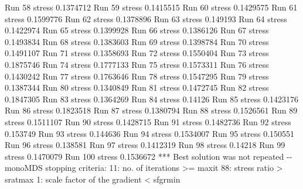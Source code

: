 \documentclass[
]{book}
\newenvironment{Shaded}{\begin{snugshade}}{\end{snugshade}}
\newcommand{\NormalTok}[1]{#1}
\begin{document}
\begin{Shaded}
\begin{Highlighting}[]
\NormalTok{Run 58 stress 0.1374712 }
\NormalTok{Run 59 stress 0.1415515 }
\NormalTok{Run 60 stress 0.1429575 }
\NormalTok{Run 61 stress 0.1599776 }
\NormalTok{Run 62 stress 0.1378896 }
\NormalTok{Run 63 stress 0.149193 }
\NormalTok{Run 64 stress 0.1422974 }
\NormalTok{Run 65 stress 0.1399928 }
\NormalTok{Run 66 stress 0.1386126 }
\NormalTok{Run 67 stress 0.1493834 }
\NormalTok{Run 68 stress 0.1383603 }
\NormalTok{Run 69 stress 0.1398784 }
\NormalTok{Run 70 stress 0.1491107 }
\NormalTok{Run 71 stress 0.1358693 }
\NormalTok{Run 72 stress 0.1550404 }
\NormalTok{Run 73 stress 0.1875746 }
\NormalTok{Run 74 stress 0.1777133 }
\NormalTok{Run 75 stress 0.1573311 }
\NormalTok{Run 76 stress 0.1430242 }
\NormalTok{Run 77 stress 0.1763646 }
\NormalTok{Run 78 stress 0.1547295 }
\NormalTok{Run 79 stress 0.1387344 }
\NormalTok{Run 80 stress 0.1340849 }
\NormalTok{Run 81 stress 0.1472745 }
\NormalTok{Run 82 stress 0.1847305 }
\NormalTok{Run 83 stress 0.1364269 }
\NormalTok{Run 84 stress 0.14126 }
\NormalTok{Run 85 stress 0.1423176 }
\NormalTok{Run 86 stress 0.1823518 }
\NormalTok{Run 87 stress 0.1380794 }
\NormalTok{Run 88 stress 0.1526561 }
\NormalTok{Run 89 stress 0.1511107 }
\NormalTok{Run 90 stress 0.1428715 }
\NormalTok{Run 91 stress 0.1482736 }
\NormalTok{Run 92 stress 0.153749 }
\NormalTok{Run 93 stress 0.144636 }
\NormalTok{Run 94 stress 0.1534007 }
\NormalTok{Run 95 stress 0.150551 }
\NormalTok{Run 96 stress 0.138581 }
\NormalTok{Run 97 stress 0.1412319 }
\NormalTok{Run 98 stress 0.14218 }
\NormalTok{Run 99 stress 0.1470079 }
\NormalTok{Run 100 stress 0.1536672 }
\NormalTok{*** Best solution was not repeated {-}{-} monoMDS stopping criteria:}
\NormalTok{    11: no. of iterations \textgreater{}= maxit}
\NormalTok{    88: stress ratio \textgreater{} sratmax}
\NormalTok{     1: scale factor of the gradient \textless{} sfgrmin}
\end{Highlighting}
\end{Shaded}
\end{document}
